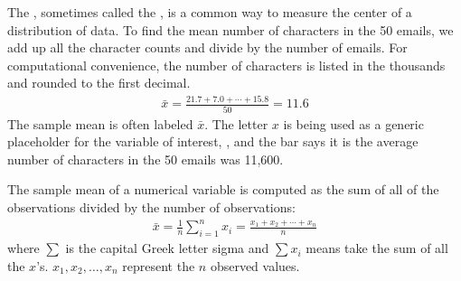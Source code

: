 The , sometimes called the , is a common way to measure the center of a distribution of data. To find the mean number of characters in the 50 emails, we add up all the character counts and divide by the number of emails. For computational convenience, the number of characters is listed in the thousands and rounded to the first decimal.
\begin{eqnarray}
\bar{x} = \frac{21.7 + 7.0 + \cdots + 15.8}{50} = 11.6
\label{sampleMeanEquation}
\end{eqnarray}
The sample mean is often labeled $\bar{x}$. The letter $x$ is being used as a generic placeholder for the variable of interest, , and the bar says it is the average number of characters in the 50 emails was 11,600. 


\begin{termBox}{%
The sample mean of a numerical variable is computed as the sum of all of the observations divided by the number of observations:
\begin{eqnarray}
\bar{x} = \frac{1}{n}\sum_{i=1}^{n}x_{i} = \frac{x_1+x_2+\cdots+x_n}{n}
\label{meanEquation}
\end{eqnarray} 
where $\sum$ is the capital Greek letter sigma and $\sum{x_{i}}$ means take the sum of all the $x$'s.
 $x_1, x_2, \dots, x_n$ represent the $n$ observed values.}
\end{termBox}\vspace{-2mm}


